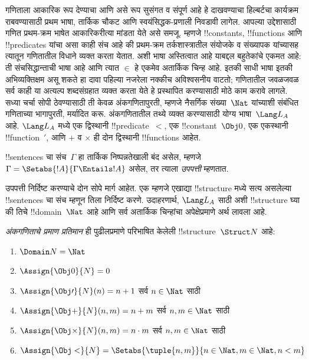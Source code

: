 \documentclass[../../../include/open-logic-section]{subfiles}
\begin{document}


गणिताला आकारिक रूप देण्याचा आणि असे रूप सुसंगत व संपूर्ण आहे हे
दाखवण्याचा हिल्बर्टचा कार्यक्रम राबवण्यासाठी प्रथम भाषा, तार्किक चौकट
आणि स्वयंसिद्धक-प्रणाली निवडावी लागेल. आपल्या उद्देशासाठी गणित प्रथम-क्रम
भाषेत आकारिकरीत्या मांडता येते असे समजू. म्हणजे !!{constant}s,
!!{function}s आणि !!{predicate}s यांचा असा काही संच आहे की प्रथम-क्रम
तर्कशास्त्रातील संयोजके व संख्यापक यांच्यासह त्यातून गणितातील विधाने
व्यक्त करता येतात. अशी भाषा अस्तित्वात आहे याबद्दल बहुतेकांचे एकमत
आहे: ती संचसिद्धान्ताची भाषा आहे आणि त्यात $\in$ हे एकमेव अतार्किक
चिन्ह आहे. इतकी साधी भाषा इतकी अभिव्यक्तिक्षम असू शकते हा दावा
पहिल्या नजरेला नक्कीच अविश्वसनीय वाटतो; गणितातील जवळजवळ सर्व काही
या अत्यल्प शब्दसंग्रहात व्यक्त करता येते हे प्रस्थापित करण्यासाठी
मोठे काम करावे लागले. सध्या चर्चा सोपी ठेवण्यासाठी ती केवळ
अंकगणितापुरती, म्हणजे नैसर्गिक संख्या~$\Nat$ यांच्याशी संबंधित
गणिताच्या भागापुरती, मर्यादित करू. अंकगणितातील तथ्ये व्यक्त करण्यासाठी
योग्य भाषा~$\Lang L_A$ आहे. $\Lang L_A$ मध्ये एक द्विस्थानी
!!{predicate}~$<$, एक !!{constant}~$\Obj 0$, एक एकस्थानी
!!{function}~$\prime$, आणि $+$ व $\times$ ही दोन द्विस्थानी
!!{function}s आहेत.

\begin{defn}
!!{sentence}s चा संच~$\Gamma$ हा तार्किक निष्पन्नतेखाली बंद असेल, म्हणजे
$\Gamma = \Setabs{!A}{\Gamma \Entails
!A}$ असेल, तर त्याला \emph{उपपत्ती} म्हणतात.
\end{defn}

उपपत्ती निर्दिष्ट करण्याचे दोन सोपे मार्ग आहेत. एक म्हणजे एखाद्या
!!{structure} मध्ये सत्य असलेल्या !!{sentence}s चा संच म्हणून
तिला निर्दिष्ट करणे. उदाहरणार्थ, $\Lang L_A$ साठी अशी !!{structure}
घ्या की तिचे !!{domain}~$\Nat$ आहे आणि सर्व अतार्किक चिन्हांचा
अपेक्षेप्रमाणे अर्थ लावला आहे.

\begin{defn}
\emph{अंकगणिताचे प्रमाण प्रतिमान} ही पुढीलप्रमाणे परिभाषित
केलेली !!{structure}~$\Struct
N$ आहे:
\begin{enumerate}
\item $\Domain N = \Nat$
\item $\Assign{\Obj 0}{N} = 0$
\item $\Assign{\Obj \prime}{N}(n) = n + 1$ सर्व $n \in \Nat$ साठी
\item $\Assign{\Obj +}{N}(n, m) = n + m$ सर्व $n, m \in \Nat$ साठी
\item $\Assign{\Obj \times}{N}(n, m) = n\cdot m$ सर्व $n, m \in \Nat$ साठी
\item $\Assign{\Obj <}{N} = \Setabs{\tuple{n, m}}{n \in \Nat, m \in
  \Nat, n < m}$
\end{enumerate}
\end{defn}
\end{document}
